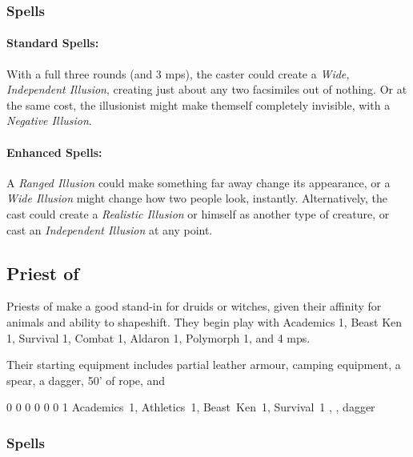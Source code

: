 {\begin{multicols}{2}
\subsubsection{Spells}
\paragraph{Standard Spells:}

With a full three rounds (and 3 \glspl{mp}), the caster could create a \textit{Wide, Independent Illusion}, creating just about any two facsimiles out of nothing.
Or at the same cost, the illusionist might make themself completely invisible, with a \textit{Negative Illusion}.

\paragraph{Enhanced Spells:}
A \textit{Ranged Illusion} could make something far away change its appearance, or a \textit{Wide Illusion} might change how two people look, instantly.
Alternatively, the cast could create a \textit{Realistic Illusion} or himself as another type of creature, or cast an \textit{Independent Illusion} at any point.

\subsection{Priest of }

Priests of  make a good stand-in for druids or witches, given their affinity for animals and ability to shapeshift.
They begin play with Academics 1, Beast Ken 1, Survival 1, Combat 1, Aldaron 1, Polymorph 1, and 4 \glspl{mp}.

Their starting equipment includes partial leather armour, camping equipment, a spear, a dagger, 50' of rope, and 


{0}%
{0}%
{{0}%
{0}%
{0}}%
{0}%
{1}%
{Academics~1, Athletics~1, Beast~Ken~1, Survival~1
}%
{\spear, \partialleather, dagger}%
{}

\subsubsection{Spells}


\end{multicols}}
